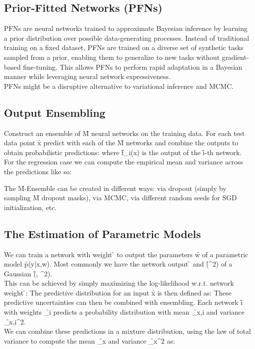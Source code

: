 \subsection{Prior-Fitted Networks (PFNs)}
PFNs are neural networks trained to approximate Bayesian inference by learning a prior distribution over possible data-generating processes. Instead of traditional training on a fixed dataset, PFNs are trained on a diverse set of synthetic tasks sampled from a prior, enabling them to generalize to new tasks without gradient-based fine-tuning. This allows PFNs to perform rapid adaptation in a Bayesian manner while leveraging neural network expressiveness.\\
PFNs might be a disruptive alternative to variational inference and MCMC.


\subsection{Output Ensembling}
Construct an ensemble of \f{M} neural networks on the training data. For each test data point \f{x} predict with each of the \f{M} networks and combine the outputs to obtain probabilistic predictions:
where \f{f_i(x)} is the output of the \f{i}-th network. For the regression case we can compute the empirical mean and variance across the predictions like so:

The \f{M}-Ensemble can be created in different ways: via dropout (simply by sampling \f{M} dropout masks), via MCMC, via different random seeds for SGD initialization, etc.

\subsection{The Estimation of Parametric Models}
We can train a network with weight \f{\theta} to output the parameters \f{w} of a parametric model \f{p(y|x,w)}. Most commonly we have the network output \f{\mu} and \f{\log(\sigma^2)} of a Gaussian \f{(\mu, \sigma^2)}.\\
This can be achieved by simply maximizing the log-likelihood w.r.t. network weight \f{\theta}:
The predictive distribution for an input \f{x} is then defined as:
These predictive uncertainties can then be combined with ensembling. Each network \f{i} with weights \f{\theta_i} predicts a probability distribution with mean \f{\mu_{x,i}} and variance \f{\sigma_{x,i}^2}.\\
We can combine these predictions in a mixture distribution, using the law of total variance to compute the mean \f{\mu_x} and variance \f{\sigma_x^2} as:
